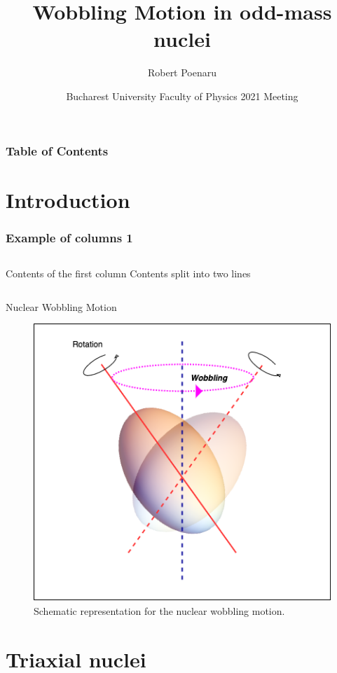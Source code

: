 \documentclass{beamer}
\title[Wobbling Motion in Odd-Mass Nuclei] %
{Wobbling Motion in odd-mass nuclei}
\author[R. Poenaru] %
{Robert Poenaru\inst{1,2}}
\institute[DFT @ IFIN-HH] %
{
  \inst{1}%
  Department of Theoretical Physics\newline
  IFIN-HH
  \and
  \inst{2}%
  Faculty of Physics\newline
  University of Bucharest
}
\date[\today] %
{Bucharest University Faculty of Physics 2021 Meeting}
\begin{document}
\maketitle
\begin{frame}
\frametitle{Table of Contents}
\tableofcontents
\section{Introduction}
\end{frame}
\begin{frame}
    \frametitle{Example of columns 1}
    \begin{columns}[c] %
     Contents of the first column
     Contents split \newline into two lines
    \end{columns}
\end{frame}


\begin{frame}{Nuclear Wobbling Motion}
      \begin{figure}
          \centering
          \includegraphics[scale=0.45]{figs/wobbling_drawing.png}
          \caption{Schematic representation for the nuclear wobbling motion.}
          \label{wobbling_picture}
      \end{figure}
\end{frame}
\section{Triaxial nuclei}
\end{document}
